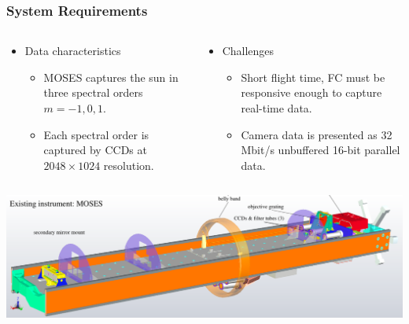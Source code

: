 \documentclass[landscape,xcolor={table},10pt]{beamer}
\begin{document}
	\begin{frame}
		\frametitle{System Requirements}
		
				\begin{columns}[T] %
				\begin{column}{.49\textwidth}
					\begin{itemize}
						\item Data characteristics
						\begin{itemize}
							\item MOSES captures the sun in three spectral orders $m=-1,0,1$.
							\item Each spectral order is captured by CCDs at $2048 \times 1024$ resolution.
								
						\end{itemize}
					\end{itemize}
					
				\end{column}%
				\hfill%
				\begin{column}{.49\textwidth}
				
					\begin{itemize}
						\item Challenges
						\begin{itemize}
							\item Short flight time, FC must be responsive enough to capture real-time data.
							\item Camera data is presented as 32 Mbit/s unbuffered 16-bit parallel data.
						\end{itemize}
					\end{itemize}
				
				\end{column}%
				\end{columns}
		
		\includegraphics[width=\textwidth]{images/moses}

	\end{frame}
	
\end{document}
